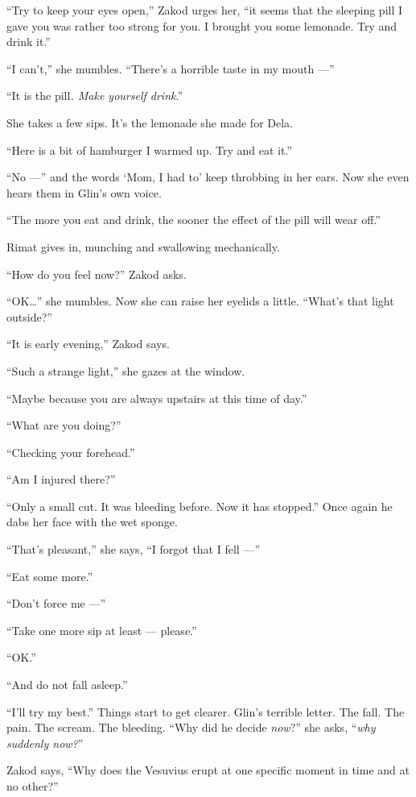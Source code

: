 \documentclass[twoside,11pt,openany]{book}
\begin{document}
``Try to keep your eyes open,'' Zakod urges her, ``it seems that the sleeping pill I gave you was rather too strong
for you. I brought you some lemonade. Try and drink it.''

``I can't,'' she mumbles. ``There's a horrible taste in my mouth ---''

``It is the pill\textit{. Make yourself drink}.{}''

She takes a few sips. It's the lemonade she made for Dela.

``Here is a bit of hamburger I warmed up. Try and eat it.{}''

``No ---'' and the words `Mom, I had to' keep throbbing in her ears. Now she even hears them in Glin's own voice.

``The more you eat and drink, the sooner the effect of the pill will wear off.''

Rimat gives in, munching and swallowing mechanically.

``How do you feel now?'' Zakod asks.

``OK{\ldots}'' she mumbles. Now she can raise her eyelids a little. ``What's that light outside?''

``It is early evening,'' Zakod says.

``Such a strange light,'' she gazes at the window.

``Maybe because you are always upstairs at this time of day.''

``What are you doing?''

``Checking your forehead.''

``Am I injured there?''

``Only a small cut. It was bleeding before. Now it has stopped.'' Once again he dabs her face with the wet sponge.

``That's pleasant,'' she says, ``I forgot that I fell ---''

``Eat some more.''

``Don't force me ---''

``Take one more sip at least --- please.''

``OK.''

``And do not fall asleep.''

``I'll try my best.'' Things start to get clearer. Glin's terrible letter. The fall. The pain. The scream. The
bleeding. ``Why did he decide \textit{now}?'' she asks, ``\textit{why suddenly now?}{}''

Zakod says, ``Why does the Vesuvius erupt at one specific moment in time and at no other?''
\end{document}

